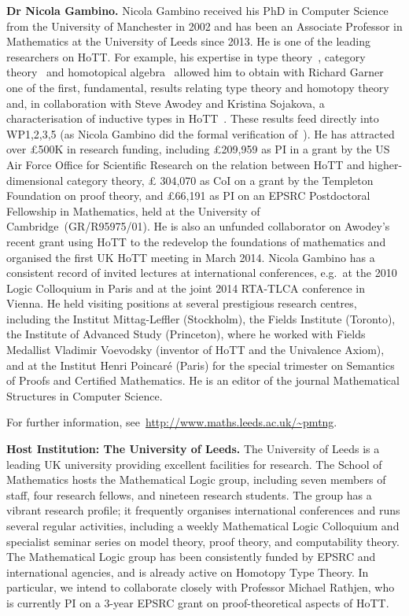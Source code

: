 \documentclass[a4paper,11pt]{article}
\begin{document}
\textbf{Dr Nicola Gambino.} Nicola Gambino received his PhD in
Computer Science from the University of Manchester in 2002 and has
been an Associate Professor in Mathematics at the University of
Leeds since 2013.  He is one of the leading researchers on HoTT. For
example, his expertise in type
theory~\cite{GambinoN:gentti}, category theory~\cite{GambinoN:polfpm}
and homotopical algebra~\cite{GambinoN:homl2c,GambinoN:weilsh} allowed
him to obtain with Richard Garner one of the first, fundamental,
results relating type theory and homotopy
theory~\cite{GambinoN:idetwfs} and, in collaboration with Steve Awodey
and Kristina Sojakova, a characterisation of inductive types in
HoTT~\cite{awodeyGamSoja:indTypesInHTT}. These results feed directly
into WP1,2,3,5 (as Nicola Gambino did the formal verification
of~\cite{awodeyGamSoja:indTypesInHTT}). He has attracted over
\pounds500K in research funding, including \pounds 209,959 as PI in a
grant by the US Air Force Office for Scientific Research on the
relation between HoTT and higher-dimensional category theory, \pounds
304,070 as CoI on a grant by the Templeton Foundation on proof theory,
and \pounds 66,191 as PI on an EPSRC Postdoctoral Fellowship in
Mathematics, held at the University of Cambridge~(GR/R95975/01). He is
also an unfunded collaborator on Awodey's recent grant using HoTT to
the redevelop the foundations of mathematics and organised the first
UK HoTT meeting in March 2014. Nicola Gambino has a consistent record
of invited lectures at international conferences, {e.g.}~at the 2010
Logic Colloquium in Paris and at the joint 2014 RTA-TLCA conference in
Vienna. He held visiting positions at several prestigious research
centres, including the Institut Mittag-Leffler (Stockholm), the Fields
Institute (Toronto), the Institute of Advanced Study (Princeton),
where he worked with Fields Medallist Vladimir Voevodsky (inventor of
HoTT and the Univalence Axiom), and at the Institut Henri Poincar\'e
(Paris) for the special trimester on Semantics of Proofs and Certified
Mathematics.  He is an editor of the journal Mathematical Structures
in Computer Science.

For further information,  see~\url{http://www.maths.leeds.ac.uk/~pmtng}.

\textbf{Host Institution: The University of Leeds.} The University of
Leeds is a leading UK university providing
excellent facilities for research. The School of Mathematics hosts the
Mathematical Logic group, including seven members of staff, four
research fellows, and nineteen research students. The group has a
vibrant research profile; it frequently organises
international conferences and runs several regular activities,
including a weekly Mathematical Logic Colloquium and specialist
seminar series on model theory, proof theory, and computability
theory. The Mathematical Logic group has been consistently funded by
EPSRC and international agencies, and is already active on Homotopy
Type Theory. In particular, we intend to collaborate closely with
Professor Michael Rathjen, who is currently PI
on a 3-year EPSRC grant on proof-theoretical aspects of HoTT. 
\end{document}
